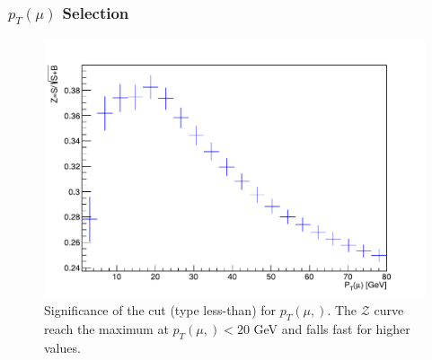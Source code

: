\documentclass{beamer}
\begin{document}
\begin{frame}
\frametitle{$p_T(\mu)$ Selection}
\begin{figure}[!h]

\centering
\includegraphics[scale=0.45]{pictures/Selection/P_TMu/Sig-P_TMu}
\caption{{\scriptsize Significance of the cut (type less-than) for $p_T(\mu,)$. The $\mathcal{Z}$ curve reach the maximum at $p_T(\mu,)<20$ GeV and falls fast for higher values.}}
\label{Sig-P_TMu}

\end{figure}


\end{frame}


\end{document}
